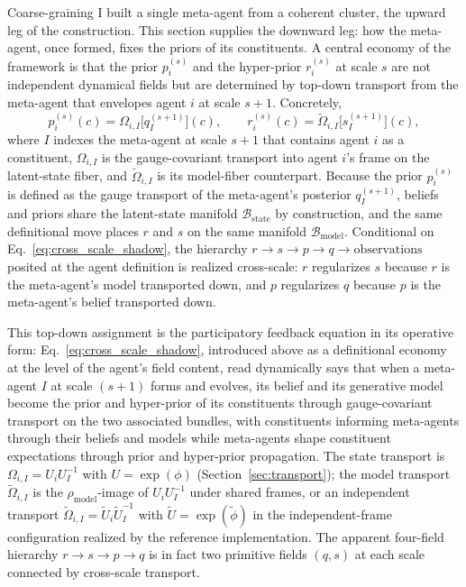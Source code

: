 \documentclass[11pt]{article}
\begin{document}
Coarse-graining I built a single meta-agent from a coherent cluster, the upward leg of the construction. This section supplies the downward leg: how the meta-agent, once formed, fixes the priors of its constituents. A central economy of the framework is that the prior $p_i^{(s)}$ and the hyper-prior $r_i^{(s)}$ at scale $s$ are not independent dynamical fields but are determined by top-down transport from the meta-agent that envelopes agent $i$ at scale $s+1$. Concretely,
\begin{equation}
p_i^{(s)}(c) = \Omega_{i,I}\big[q_I^{(s+1)}\big](c),
\qquad
r_i^{(s)}(c) = \tilde\Omega_{i,I}\big[s_I^{(s+1)}\big](c),
\label{eq:cross_scale_shadow}
\end{equation}
where $I$ indexes the meta-agent at scale $s+1$ that contains agent $i$ as a constituent, $\Omega_{i,I}$ is the gauge-covariant transport into agent $i$'s frame on the latent-state fiber, and $\tilde\Omega_{i,I}$ is its model-fiber counterpart. Because the prior $p_i^{(s)}$ is defined as the gauge transport of the meta-agent's posterior $q_I^{(s+1)}$, beliefs and priors share the latent-state manifold $\mathcal{B}_{\mathrm{state}}$ by construction, and the same definitional move places $r$ and $s$ on the same manifold $\mathcal{B}_{\mathrm{model}}$. Conditional on Eq.~\eqref{eq:cross_scale_shadow}, the hierarchy $r \to s \to p \to q \to \text{observations}$ posited at the agent definition is realized cross-scale: $r$ regularizes $s$ because $r$ is the meta-agent's model transported down, and $p$ regularizes $q$ because $p$ is the meta-agent's belief transported down.

This top-down assignment is the participatory feedback equation in its operative form: Eq.~\eqref{eq:cross_scale_shadow}, introduced above as a definitional economy at the level of the agent's field content, read dynamically says that when a meta-agent $I$ at scale $(s+1)$ forms and evolves, its belief and its generative model become the prior and hyper-prior of its constituents through gauge-covariant transport on the two associated bundles, with constituents informing meta-agents through their beliefs and models while meta-agents shape constituent expectations through prior and hyper-prior propagation. The state transport is $\Omega_{i,I} = U_i U_I^{-1}$ with $U = \exp(\phi)$ (Section~\ref{sec:transport}); the model transport $\tilde\Omega_{i,I}$ is the $\rho_{\mathrm{model}}$-image of $U_i U_I^{-1}$ under shared frames, or an independent transport $\tilde\Omega_{i,I} = \tilde U_i \tilde U_I^{-1}$ with $\tilde U = \exp(\tilde\phi)$ in the independent-frame configuration realized by the reference implementation. The apparent four-field hierarchy $r \to s \to p \to q$ is in fact two primitive fields $(q, s)$ at each scale connected by cross-scale transport.
\end{document}
